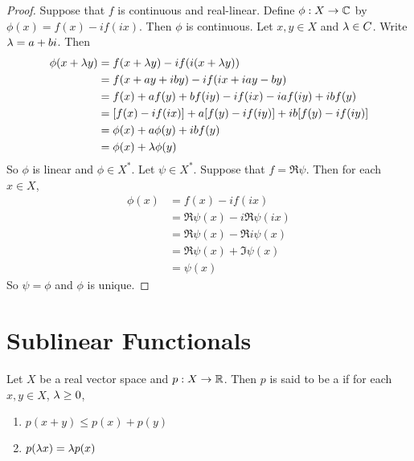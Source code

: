 \documentclass{book}
\begin{document}
	\begin{proof}
		Suppose that $f$ is continuous and real-linear. Define $\phi:X \rightarrow \mathbb{C}$ by $\phi(x) = f(x) -if(ix)$. Then $\phi$ is continuous. Let $x,y \in X$ and $\lambda \in C$. Write $\lambda = a + bi$. Then 
		\begin{align*}
			\phi(x + \lambda y)
			&= f(x + \lambda y) -if(i(x + \lambda y)) \\
			&= f(x + ay + i by) -if(ix + iay - by) \\
			&= f(x) + af(y) + bf(iy) - if(ix) - iaf(iy) +ibf(y) \\
			&= [f(x) - if(ix)] + a[f(y) - if(iy)] + ib[f(y) -if(iy)] \\
			&= \phi(x) + a\phi(y) +ibf(y) \\
			&= \phi(x) + \lambda \phi(y) 
		\end{align*}
	So $\phi$ is linear and $\phi \in X^*$. Let $\psi \in X^*$. Suppose that $f = \Re \psi$. 
	Then for each $x \in X$,
	\begin{align*}
		\phi(x) 
		&= f(x) - if(ix) \\
		&= \Re \psi(x) -i \Re \psi(ix) \\
		&= \Re \psi(x) - \Re i\psi(x) \\
		&= \Re \psi(x) + \Im \psi(x) \\
		&= \psi(x)
	\end{align*} 
	So $\psi = \phi$ and $\phi$ is unique.
	\end{proof}


		





















	
	\newpage	
	\section{Sublinear Functionals}
	
	\begin{defn} 
		Let $X$ be a real vector space and $p:X \rightarrow \mathbb{R}$. Then $p$ is said to be a  if for each $x,y \in X$, $\lambda \geq 0$, 
		\begin{enumerate}
			\item $p(x+y) \leq p(x) + p(y)$
			\item $p(\lambda x ) = \lambda p(x)$
		\end{enumerate}  
	\end{defn}
	
\end{document}
